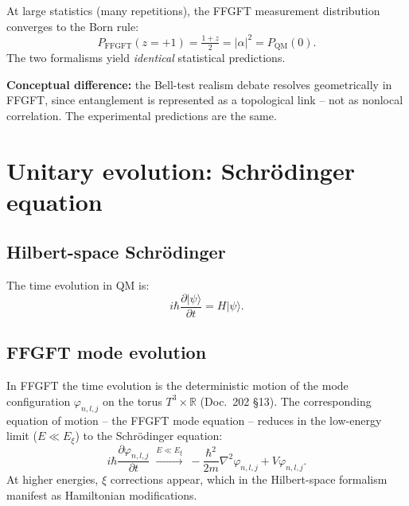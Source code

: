 At large statistics (many repetitions), the FFGFT measurement
distribution converges to the Born rule:
\begin{equation}
  P_\text{FFGFT}(z = +1) = \tfrac{1+z}{2} = |\alpha|^2 = P_\text{QM}(0).
\end{equation}
The two formalisms yield \emph{identical} statistical predictions.

\textbf{Conceptual difference:} the Bell-test realism debate
resolves geometrically in FFGFT, since entanglement is represented
as a topological link -- not as nonlocal correlation. The
experimental predictions are the same.

\section{Unitary evolution: Schrödinger equation}

\subsection{Hilbert-space Schrödinger}

The time evolution in QM is:
\begin{equation}
  i\hbar \frac{\partial |\psi\rangle}{\partial t} = H |\psi\rangle.
\end{equation}

\subsection{FFGFT mode evolution}

In FFGFT the time evolution is the deterministic motion of the
mode configuration $\varphi_{n,l,j}$ on the torus
$T^3 \times \mathbb{R}$ (Doc.~202 §13). The corresponding
equation of motion -- the FFGFT mode equation -- reduces in the
low-energy limit ($E \ll E_\xi$) to the Schrödinger equation:
\begin{equation}
  i\hbar \frac{\partial \varphi_{n,l,j}}{\partial t}
  \;\xrightarrow{E \ll E_\xi}\;
  -\frac{\hbar^2}{2m}\nabla^2 \varphi_{n,l,j} + V \varphi_{n,l,j}.
\end{equation}
At higher energies, $\xi$ corrections appear, which in the
Hilbert-space formalism manifest as Hamiltonian modifications.


